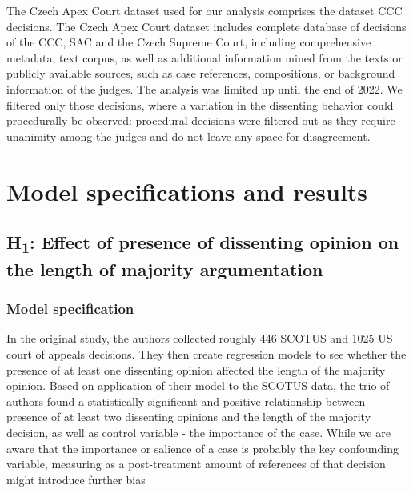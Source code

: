 \documentclass[
  11pt,
]{article}
\begin{document}
The Czech Apex Court dataset used for our analysis comprises the dataset
CCC decisions. The Czech Apex Court dataset includes complete database
of decisions of the CCC, SAC and the Czech Supreme Court, including
comprehensive metadata, text corpus, as well as additional information
mined from the texts or publicly available sources, such as case
references, compositions, or background information of the judges. The
analysis was limited up until the end of 2022. We filtered only those
decisions, where a variation in the dissenting behavior could
procedurally be observed: procedural decisions were filtered out as they
require unanimity among the judges and do not leave any space for
disagreement.

\hypertarget{model-specifications-and-results}{%
\section{Model specifications and
results}\label{model-specifications-and-results}}

\hypertarget{h1-effect-of-presence-of-dissenting-opinion-on-the-length-of-majority-argumentation}{%
\subsection{\texorpdfstring{H\textsubscript{1}: Effect of presence of
dissenting opinion on the length of majority
argumentation}{H1: Effect of presence of dissenting opinion on the length of majority argumentation}}\label{h1-effect-of-presence-of-dissenting-opinion-on-the-length-of-majority-argumentation}}

\hypertarget{model-specification}{%
\subsubsection{Model specification}\label{model-specification}}

In the original study, the authors collected roughly 446 SCOTUS and 1025
US court of appeals decisions. They then create regression models to see
whether the presence of at least one dissenting opinion affected the
length of the majority opinion. Based on application of their model to
the SCOTUS data, the trio of authors found a statistically significant
and positive relationship between presence of at least two dissenting
opinions and the length of the majority decision, as well as control
variable - the importance of the case. While we are aware that the
importance or salience of a case is probably the key confounding
variable, measuring as a post-treatment amount of references of that
decision might introduce further bias
\end{document}
